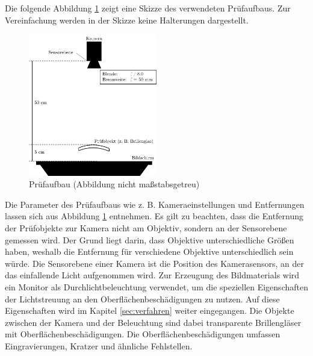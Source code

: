 Die folgende Abbildung \ref{img:pruefaufbau} zeigt eine Skizze des verwendeten Prüfaufbaus.
Zur Vereinfachung werden in der Skizze keine Halterungen dargestellt.

\begin{figure}[H]
	\centering
	\includegraphics[width=0.5\textwidth]{03_sichtpruefungDurchLichtstreuung/pruefaufbau/figures/aufbau}
	\caption[Prüfaufbau]{Prüfaufbau (Abbildung nicht maßstabsgetreu)}
	\label{img:pruefaufbau}
\end{figure}

\noindent
Die Parameter des Prüfaufbaus wie z. B. Kameraeinstellungen und Entfernungen lassen sich aus Abbildung \ref{img:pruefaufbau} entnehmen.
Es gilt zu beachten, dass die Entfernung der Prüfobjekte zur Kamera nicht am Objektiv, sondern an der Sensorebene gemessen wird.
Der Grund liegt darin, dass Objektive unterschiedliche Größen haben, weshalb die Entfernung für verschiedene Objektive unterschiedlich sein würde.
Die Sensorebene einer Kamera ist die Position des Kamerasensors, an der das einfallende Licht aufgenommen wird.
Zur Erzeugung des Bildmaterials wird ein Monitor als Durchlichtbeleuchtung verwendet, um die speziellen Eigenschaften der Lichtstreuung an den Oberflächenbeschädigungen zu nutzen.
Auf diese Eigenschaften wird im Kapitel \ref{sec:verfahren} weiter eingegangen.
Die Objekte zwischen der Kamera und der Beleuchtung sind dabei transparente Brillengläser mit Oberflächenbeschädigungen.
Die Oberflächenbeschädigungen umfassen Eingravierungen, Kratzer und ähnliche Fehlstellen.